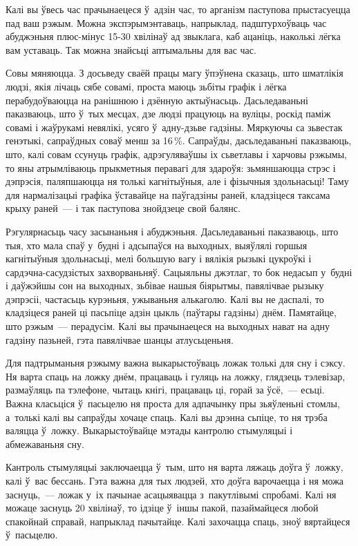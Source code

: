 Калі вы ўвесь час прачынаецеся ў~адзін час, то арганізм паступова прыстасуецца пад ваш рэжым. Можна экспэрымэнтаваць, напрыклад, падштурхоўваць час абуджэньня плюс-мінус 15-30 хвілінаў ад звыклага, каб ацаніць, наколькі лёгка вам уставаць. Так можна знайсьці аптымальны для вас час.

Совы мяняюцца. З досьведу сваёй працы магу ўпэўнена сказаць, што шматлікія людзі, якія лічаць сябе совамі, проста маюць зьбіты графік і лёгка перабудоўваюцца на ранішнюю і дзённую актыўнасьць. Дасьледаваньні паказваюць, што ў~тых месцах, дзе людзі працуюць на вуліцы, роскід паміж совамі і жаўрукамі невялікі, усяго ў~адну-дзьве гадзіны. Мяркуючы са зьвестак генэтыкі, сапраўдных соваў менш за 16\,\%. Сапраўды, дасьледаваньні паказваюць, што, калі совам ссунуць графік, адрэгуляваўшы іх сьветлавы і харчовы рэжымы, то яны атрымліваюць прыкметныя перавагі для здароўя: зьмяншаюцца стрэс і дэпрэсія, паляпшаюцца ня толькі кагнітыўныя, але і фізычныя здольнасьці! Таму для нармалізацыі графіка ўставайце на паўгадзіны раней, кладзіцеся таксама крыху раней~--- і так паступова знойдзеце свой балянс.

Рэгулярнасьць часу засынаньня і абуджэньня. Дасьледаваньні паказваюць, што тыя, хто мала спаў у~будні і адсыпаўся на выходных, выяўлялі горшыя кагнітыўныя здольнасьці, мелі большую вагу і вялікія рызыкі цукроўкі і сардэчна-сасудзістых захворваньняў. Сацыяльны джэтлаг, то бок недасып у~будні і даўжэйшы сон на выходных, зьбівае нашыя біярытмы, павялічвае рызыку дэпрэсіі, частасьць курэньня, ужываньня алькаголю. Калі вы не даспалі, то кладзіцеся раней ці пасьпіце адзін цыкль (паўтары гадзіны) днём. Памятайце, што рэжым~--- перадусім. Калі вы прачынаецеся на выходных нават на адну гадзіну пазьней, гэта павялічвае шанцы атлусьценьня.

Для падтрыманьня рэжыму важна выкарыстоўваць ложак толькі для сну і сэксу. Ня варта спаць на ложку днём, працаваць і гуляць на ложку, глядзець тэлевізар, размаўляць па тэлефоне, чытаць кнігі, працаваць ці, горай за ўсё,~--- есьці. Важна класьціся ў~пасьцелю ня проста для адпачынку пры зьяўленьні стомлы, а~толькі калі вы сапраўды хочаце спаць. Калі вы дрэнна сьпіце, то ня трэба валяцца ў~ложку. Выкарыстоўвайце мэтады кантролю стымуляцыі і абмежаваньня сну.

Кантроль стымуляцыі заключаецца ў~тым, што ня варта ляжаць доўга ў~ложку, калі ў~вас бессань. Гэта важна для тых людзей, хто доўга варочаецца і ня можа заснуць,~--- ложак у~іх пачынае асацыявацца з~пакутлівымі спробамі. Калі ня можаце заснуць 20 хвілінаў, то ідзіце ў~іншы пакой, пазаймайцеся любой спакойнай справай, напрыклад пачытайце. Калі захочацца спаць, зноў вяртайцеся ў~пасьцелю.

